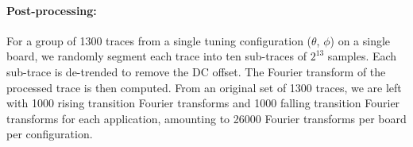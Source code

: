 \paragraph{Post-processing:}
For a group of 1300 traces from a single tuning configuration ($\theta$, $\phi$) on a single board, we randomly segment each trace into ten sub-traces of $2^{13}$ samples. Each sub-trace is de-trended to remove the DC offset. The Fourier transform of the processed trace is then computed. From an original set of 1300 traces, we are left with 1000 rising transition Fourier transforms and 1000 falling transition Fourier transforms for each application, amounting to 26000 Fourier transforms per board per configuration.

